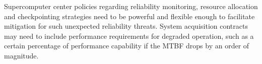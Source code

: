 Supercomputer center policies regarding reliability monitoring, resource
allocation and checkpointing strategies need to be powerful and flexible enough
to facilitate mitigation for such unexpected reliability threats. System
acquisition contracts may need to include performance requirements for degraded
operation, such as a certain percentage of performance capability if the MTBF
drops by an order of magnitude.

